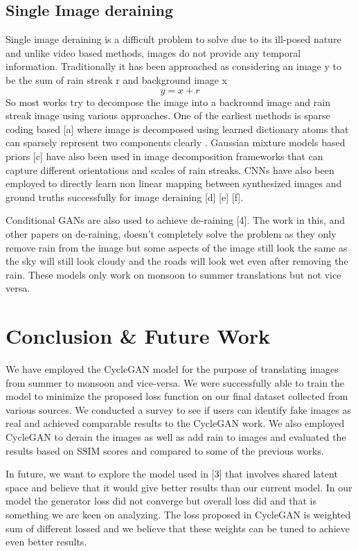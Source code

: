 \documentclass{article}
\begin{document}
\subsection{Single Image deraining}

Single image deraining is a difficult problem to solve due to its ill-posed nature and unlike video based methods, images do not provide any temporal information. Traditionally it has been approached as considering an image y to be the sum of rain streak r and background image x
$$y = x + r$$
So most works try to decompose the image into a backround image and rain streak image using various approaches. One of the earliest methods is sparse coding based [a] where image is decomposed using learned dictionary atoms that can sparsely represent two components clearly . Gaussian mixture models based priors [c] have also been used in image decomposition frameworks that can capture different orientations and scales of rain streaks. CNNs have also been employed to directly learn non linear mapping between synthesized images and ground truths successfully for image deraining [d] [e] [f].

Conditional GANs are also used to achieve de-raining [4]. The work in this, and other papers on de-raining, doesn’t completely solve the problem as they only remove rain from the image but some aspects of the image still look the same as the sky will still look cloudy and the roads will look wet even after removing the rain. These models only work on monsoon to summer translations but not vice versa.

\section{Conclusion \& Future Work}

We have employed the CycleGAN model for the purpose of translating images from summer to monsoon and vice-versa. We were successfully able to train the model to minimize the proposed loss function on our final dataset collected from various sources. We conducted a survey to see if users can identify fake images as real and achieved comparable results to the CycleGAN work. We also employed CycleGAN to derain the images as well as add rain to images and evaluated the results based on SSIM scores and compared to some of the previous works.

In future, we want to explore the model used in [3] that involves shared latent space and believe that it would give better results than our current model. In our model the generator loss did not converge but overall loss did and that is something we are keen on analyzing. The loss proposed in CycleGAN is weighted sum of different lossed and we believe that these weights can be tuned to achieve even better results.
\end{document}

